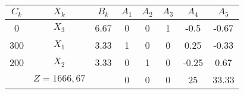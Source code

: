    \begin{tabular}{cccccccc}
    \hline
    \hline
    $C_k$   & $X_k$   & $B_k$   & $A_1$   & $A_2$   & $A_3$   & $A_4$   & $A_5$ \bigstrut\\
    \hline
    0       & $X_3$   & 6.67    & 0       & 0       & 1       & -0.5    & -0.67 \bigstrut[t]\\
    300     & $X_1$   & 3.33    & 1       & 0       & 0       & 0.25    & -0.33 \\
    200     & $X_2$   & 3.33    & 0       & 1       & 0       & -0.25   & 0.67 \bigstrut[b]\\
    \hline
            & $Z=1666,67$ &         & 0       & 0       & 0       & 25      & 33.33 \bigstrut\\
    \hline
    \hline
    \end{tabular}%
